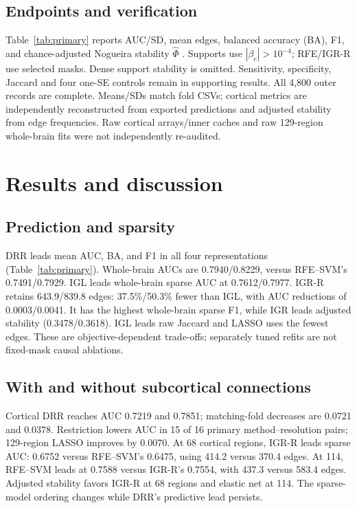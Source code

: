 \documentclass{article}
\begin{document}
\subsection{Endpoints and verification}
Table~\ref{tab:primary} reports AUC/SD, mean edges, balanced accuracy (BA), F1, and chance-adjusted Nogueira stability $\widehat\Phi$ \cite{nogueira}. Supports use $|\beta_e|>10^{-4}$; RFE/IGR-R use selected masks. Dense support stability is omitted. Sensitivity, specificity, Jaccard and four one-SE controls remain in supporting results. All 4,800 outer records are complete. Means/SDs match fold CSVs; cortical metrics are independently reconstructed from exported predictions and adjusted stability from edge frequencies. Raw cortical arrays/inner caches and raw 129-region whole-brain fits were not independently re-audited.



\section{Results and discussion}
\subsection{Prediction and sparsity}
DRR leads mean AUC, BA, and F1 in all four representations (Table~\ref{tab:primary}). Whole-brain AUCs are 0.7940/0.8229, versus RFE--SVM's 0.7491/0.7929. IGL leads whole-brain sparse AUC at 0.7612/0.7977. IGR-R retains 643.9/839.8 edges: 37.5\%/50.3\% fewer than IGL, with AUC reductions of 0.0003/0.0041. It has the highest whole-brain sparse F1, while IGR leads adjusted stability (0.3478/0.3618). IGL leads raw Jaccard and LASSO uses the fewest edges. These are objective-dependent trade-offs; separately tuned refits are not fixed-mask causal ablations.

\subsection{With and without subcortical connections}
Cortical DRR reaches AUC 0.7219 and 0.7851; matching-fold decreases are 0.0721 and 0.0378. Restriction lowers AUC in 15 of 16 primary method--resolution pairs; 129-region LASSO improves by 0.0070. At 68 cortical regions, IGR-R leads sparse AUC: 0.6752 versus RFE--SVM's 0.6475, using 414.2 versus 370.4 edges. At 114, RFE--SVM leads at 0.7588 versus IGR-R's 0.7554, with 437.3 versus 583.4 edges. Adjusted stability favors IGR-R at 68 regions and elastic net at 114. The sparse-model ordering changes while DRR's predictive lead persists.
\end{document}
